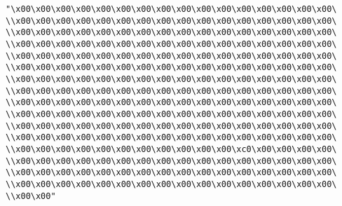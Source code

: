 \verb|"\x00\x00\x00\x00\x00\x00\x00\x00\x00\x00\x00\x00\x00\x00\x00\x00\|\newline
\verb|\\x00\x00\x00\x00\x00\x00\x00\x00\x00\x00\x00\x00\x00\x00\x00\x00\|\newline
\verb|\\x00\x00\x00\x00\x00\x00\x00\x00\x00\x00\x00\x00\x00\x00\x00\x00\|\newline
\verb|\\x00\x00\x00\x00\x00\x00\x00\x00\x00\x00\x00\x00\x00\x00\x00\x00\|\newline
\verb|\\x00\x00\x00\x00\x00\x00\x00\x00\x00\x00\x00\x00\x00\x00\x00\x00\|\newline
\verb|\\x00\x00\x00\x00\x00\x00\x00\x00\x00\x00\x00\x00\x00\x00\x00\x00\|\newline
\verb|\\x00\x00\x00\x00\x00\x00\x00\x00\x00\x00\x00\x00\x00\x00\x00\x00\|\newline
\verb|\\x00\x00\x00\x00\x00\x00\x00\x00\x00\x00\x00\x00\x00\x00\x00\x00\|\newline
\verb|\\x00\x00\x00\x00\x00\x00\x00\x00\x00\x00\x00\x00\x00\x00\x00\x00\|\newline
\verb|\\x00\x00\x00\x00\x00\x00\x00\x00\x00\x00\x00\x00\x00\x00\x00\x00\|\newline
\verb|\\x00\x00\x00\x00\x00\x00\x00\x00\x00\x00\x00\x00\x00\x00\x00\x00\|\newline
\verb|\\x00\x00\x00\x00\x00\x00\x00\x00\x00\x00\x00\x00\x00\x00\x00\x00\|\newline
\verb|\\x00\x00\x00\x00\x00\x00\x00\x00\x00\x00\x00\xc0\x00\x00\x00\x00\|\newline
\verb|\\x00\x00\x00\x00\x00\x00\x00\x00\x00\x00\x00\x00\x00\x00\x00\x00\|\newline
\verb|\\x00\x00\x00\x00\x00\x00\x00\x00\x00\x00\x00\x00\x00\x00\x00\x00\|\newline
\verb|\\x00\x00\x00\x00\x00\x00\x00\x00\x00\x00\x00\x00\x00\x00\x00\x00\|\newline
\verb|\\x00\x00"|\newline
